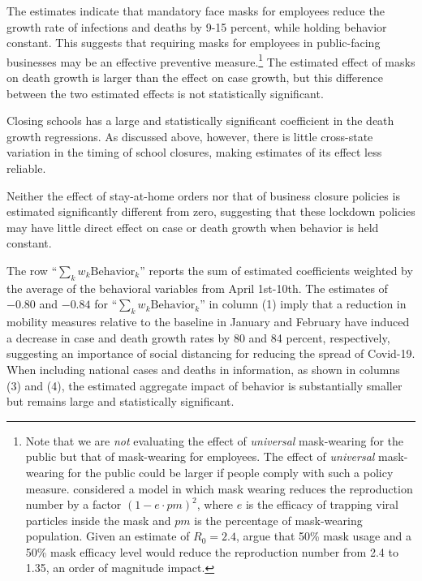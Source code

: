 \documentclass[3p, longtitle]{elsarticle}
\theoremstyle{definition}
\begin{document}
The estimates indicate that mandatory face masks for employees
reduce the growth rate of infections and deaths by 9-15 percent, while holding behavior constant. This suggests that
requiring masks for employees in public-facing businesses may be an effective preventive measure.\footnote{Note that we are \textit{not} evaluating the effect of \textit{universal} mask-wearing for the public but that of mask-wearing for employees. The effect of \textit{universal} mask-wearing for the public could be larger if people comply with such a policy measure. \cite{tian2020calibrated} considered a  model in which mask wearing reduces  the reproduction number by a factor $(1-e \cdot pm)^2$, where $e$ is the efficacy of trapping viral particles inside the mask and $pm$ is the percentage of mask-wearing population. Given an estimate of $R_0=2.4$, \cite{howard2020} argue that  50\% mask usage and a 50\% mask efficacy level would reduce the reproduction number from 2.4 to 1.35, an order of magnitude
impact.} The estimated effect of masks on death growth is larger than the effect on case growth, but this difference between the two estimated effects is not statistically significant.

Closing schools has a large and statistically
significant coefficient in the death growth regressions. As discussed
above, however, there is little cross-state variation in the timing of school
closures, making estimates of its effect less reliable.

Neither the effect of stay-at-home orders nor that of business closure policies is estimated significantly different from zero, suggesting that these lockdown policies may  have little direct
effect on case or death growth when behavior is held constant.



The row ``$\sum_k w_k \mathrm{Behavior}_k$'' reports the sum of estimated coefficients weighted by the average of the behavioral
variables from April 1st-10th. The estimates of $-0.80$ and $-0.84$ for ``$\sum_k w_k \mathrm{Behavior}_k$'' in column (1)  imply that a reduction in mobility measures relative to the baseline in January and February have induced a decrease in case and death growth rates by 80 and 84 percent, respectively, suggesting an importance of social distancing for reducing the spread of Covid-19.
When including national cases and deaths in information, as shown in columns (3) and (4), the estimated aggregate impact of behavior is substantially smaller but remains large and statistically significant.
\end{document}
